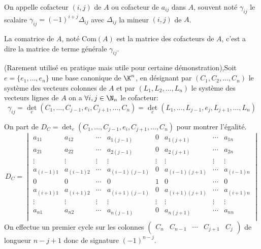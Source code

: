 \begin{defini}
On appelle cofacteur $(i,j)$ de $A$ ou  cofacteur de $a_{ij}$ dans $A$, souvent noté $\gamma_{ij}$ le scalaire  $\gamma_{ij}=(-1)^{i+j}\Delta_{ij}$ avec $\Delta_{ij}$ la mineur $(i,j)$ de $A$.\\
\end{defini}
\begin{defini}
La comatrice de $A$, noté $\text{Com}(A)$ est la matrice des cofacteurs de $A$, c'est a dire la matrice de terme générale $\gamma_{ij}$.\\
\end{defini}
\begin{prop}
(Rarement utilisé en pratique mais utile pour certaine démonstration),Soit $e=\{e_1,\dots,e_n\}$ une base canonique de $\K^n$, en désignant par $(C_1,C_2,\dots,C_n)$ le système des vecteurs colonnes de $A$ et 
par $(L_1,L_2,\dots,L_n)$ le système des vecteurs lignes de $A$ on a $\forall i,j\in\N_n$ le cofacteur:
$$\gamma_{ij}=\det_e(C_1,\dots,C_{j-1},e_i,C_{j+1},\dots,C_n)=\det_e(L_1,\dots,L_{j-1},e_j,L_{j+1},\dots,L_n)$$


\tcblower

On part de $D_C=\det_e(C_1,\dots,C_{j-1},e_i,C_{j+1},\dots,C_n)$ pour montrer l'égalité.
\[D_C=\begin{vmatrix}
a_{11} & a_{12} & \cdots &a_{1(j-1)}& 0 &a_{1(j+1)}& \cdots & a_{1n} \\
a_{21} & a_{22} & \cdots & a_{2(j-1)}& 0 &a_{2(j+1)}& \cdots & a_{2n} \\
\vdots & \vdots & \vdots & \vdots & \vdots & \vdots & \vdots & \vdots  \\
a_{(i-1)1} & a_{(i-1)2} & \cdots & a_{(i-1)(j-1)}& 0 &a_{(i-1)(j+1)}& \cdots & a_{(i-1)n} \\
0&0&\cdots&0&1&0&\cdots&0\\
a_{(i+1)1} & a_{(i+1)2} & \cdots & a_{(i+1)(j-1)}& 0 &a_{(i+1)(j+1)}& \cdots & a_{(i+1)n} \\
\vdots & \vdots & \vdots & \vdots & \vdots & \vdots & \vdots & \vdots  \\
a_{n1} & a_{n2} & \cdots &a_{n(j-1)}& 0 &a_{n(j+1)}& \cdots & a_{nn} \\
\end{vmatrix}\] On effectue un premier cycle sur les colonnes $\begin{pmatrix}
C_n & C_{n-1} & \cdots & C_{j+1} & C_j
\end{pmatrix}$ de longueur $n-j+1$ donc de signature $(-1)^{n-j}$.


\end{prop}
